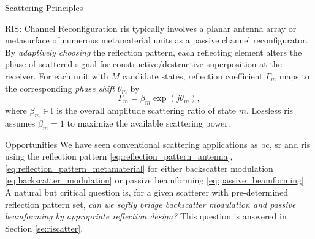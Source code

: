 \documentclass[journal]{IEEEtran}
\begin{document}
\begin{section}{Scattering Principles}
	\begin{subsection}{RIS: Channel Reconfiguration}
		\gls{ris} typically involves a planar antenna array or metasurface of numerous metamaterial units as a passive channel reconfigurator.
		By \emph{adaptively choosing} the reflection pattern, each reflecting element alters the phase of scattered signal for constructive/destructive superposition at the receiver.
		For each unit with $M$ candidate states, reflection coefficient $\Gamma_m$ maps to the corresponding \emph{phase shift $\theta_m$} by
		\begin{equation}
			\Gamma_m = \beta_m \exp(j \theta_m),
			\label{eq:passive_beamforming}
		\end{equation}
		where $\beta_m \in \mathbb{I}$ is the overall amplitude scattering ratio of state $m$.
		Lossless \gls{ris} assumes $\beta_m=1$ to maximize the available scattering power.
	\end{subsection}

	\begin{subsection}{Opportunities}
		We have seen conventional scattering applications as \gls{bc}, \gls{sr} and \gls{ris} using the reflection pattern \eqref{eq:reflection_pattern_antenna}, \eqref{eq:reflection_pattern_metamaterial} for either backscatter modulation \eqref{eq:backscatter_modulation} or passive beamforming \eqref{eq:passive_beamforming}.
		A natural but critical question is, for a given scatterer with pre-determined reflection pattern set, \emph{can we softly bridge backscatter modulation and passive beamforming by appropriate reflection design?}
		This question is answered in Section \ref{se:riscatter}.
	\end{subsection}
\end{section}
\end{document}
